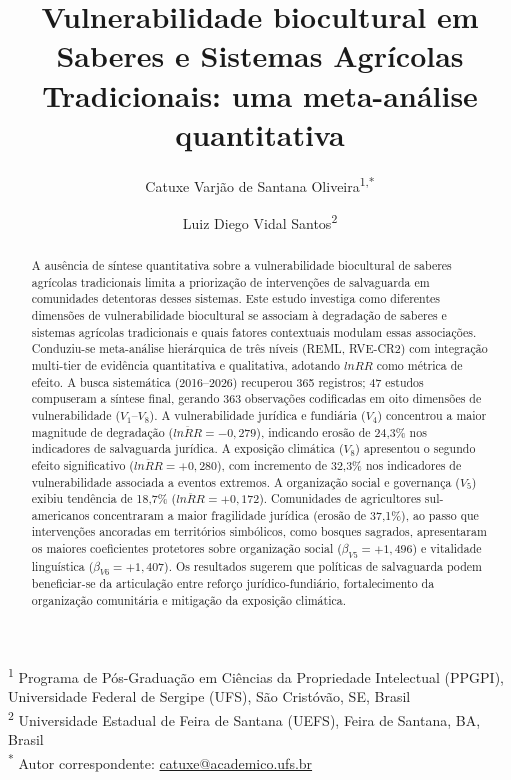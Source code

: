 \documentclass[12pt,a4paper]{article}
\begin{document}
\title{Vulnerabilidade biocultural em Saberes e Sistemas Agrícolas Tradicionais: uma meta-análise quantitativa}

\author{Catuxe Varjão de Santana Oliveira\textsuperscript{1,*} \and Luiz Diego Vidal Santos\textsuperscript{2}}

\date{}
\maketitle

\noindent\textsuperscript{1} Programa de Pós-Graduação em Ciências da Propriedade Intelectual (PPGPI), Universidade Federal de Sergipe (UFS), São Cristóvão, SE, Brasil \\
\textsuperscript{2} Universidade Estadual de Feira de Santana (UEFS), Feira de Santana, BA, Brasil \\
\textsuperscript{*} Autor correspondente: \href{mailto:catuxe@academico.ufs.br}{catuxe@academico.ufs.br}

\begin{abstract}
A ausência de síntese quantitativa sobre a vulnerabilidade biocultural de saberes agrícolas tradicionais limita a priorização de intervenções de salvaguarda em comunidades detentoras desses sistemas. Este estudo investiga como diferentes dimensões de vulnerabilidade biocultural se associam à degradação de saberes e sistemas agrícolas tradicionais e quais fatores contextuais modulam essas associações. Conduziu-se meta-análise hierárquica de três níveis (REML, RVE-CR2) com integração multi-tier de evidência quantitativa e qualitativa, adotando $lnRR$ como métrica de efeito. A busca sistemática (2016--2026) recuperou 365 registros; 47 estudos compuseram a síntese final, gerando 363 observações codificadas em oito dimensões de vulnerabilidade ($V_1$--$V_8$). A vulnerabilidade jurídica e fundiária ($V_4$) concentrou a maior magnitude de degradação ($\overline{lnRR} = -0{,}279$), indicando erosão de 24,3\% nos indicadores de salvaguarda jurídica. A exposição climática ($V_8$) apresentou o segundo efeito significativo ($\overline{lnRR} = +0{,}280$), com incremento de 32,3\% nos indicadores de vulnerabilidade associada a eventos extremos. A organização social e governança ($V_5$) exibiu tendência de 18,7\% ($\overline{lnRR} = +0{,}172$). Comunidades de agricultores sul-americanos concentraram a maior fragilidade jurídica (erosão de 37,1\%), ao passo que intervenções ancoradas em territórios simbólicos, como bosques sagrados, apresentaram os maiores coeficientes protetores sobre organização social ($\beta_{V5} = +1{,}496$) e vitalidade linguística ($\beta_{V6} = +1{,}407$). Os resultados sugerem que políticas de salvaguarda podem beneficiar-se da articulação entre reforço jurídico-fundiário, fortalecimento da organização comunitária e mitigação da exposição climática.
\end{abstract}
\end{document}
